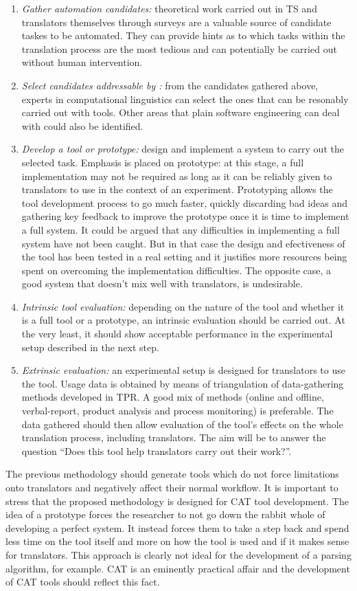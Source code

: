 \begin{enumerate}
\item \textit{Gather automation candidates:} theoretical work carried out in \ac{TS} and translators themselves through surveys are a valuable source of candidate taskes to be automated. They can provide hints as to which tasks within the translation process are the most tedious and can potentially be carried out without human intervention.
\item \textit{Select candidates addressable by :} from the candidates gathered above, experts in computational linguistics can select the ones that can be resonably carried out with  tools. Other areas that plain software engineering can deal with could also be identified. 
\item \textit{Develop a tool or prototype:} design and implement a system to carry out the selected task. Emphasis is placed on prototype: at this stage, a full implementation may not be required as long as it can be reliably given to translators to use in the context of an experiment. Prototyping allows the tool development process to go much faster, quickly discarding bad ideas and gathering key feedback to improve the prototype once it is time to implement a full system. It could be argued that any difficulties in implementing a full system have not been caught. But in that case the design and efectiveness of the tool has been tested in a real setting and it justifies more resources being spent on overcoming the implementation difficulties. The opposite case, a good system that doesn't mix well with translators, is undesirable.
\item \textit{Intrinsic tool evaluation:} depending on the nature of the tool and whether it is a full tool or a prototype, an intrinsic evaluation should be carried out. At the very least, it should show acceptable performance in the experimental setup described in the next step.
\item \textit{Extrinsic evaluation:} an experimental setup is designed for translators to use the tool. Usage data is obtained by means of triangulation of data-gathering methods developed in \ac{TPR}. A good mix of methods (online and offline, verbal-report, product analysis and process monitoring) is preferable. The data gathered should then allow evaluation of the tool's effects on the whole translation process, including translators. The aim will be to answer the question ``Does this tool help translators carry out their work?''.
\end{enumerate}

The previous methodology should generate tools which do not force limitations onto translators and negatively affect their normal workflow. It is important to stress that the proposed methodology is designed for \ac{CAT} tool development. The idea of a prototype forces the researcher to not go down the rabbit whole of developing a perfect system. It instead forces them to take a step back and spend less time on the tool itself and more on how the tool is used and if it makes sense for translators. This approach is clearly not ideal for the development of a parsing algorithm, for example. \ac{CAT} is an eminently practical affair and the development of \ac{CAT} tools should reflect this fact.
